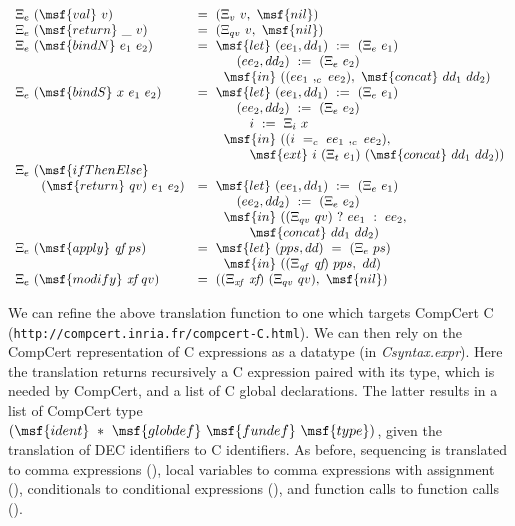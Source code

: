 \documentclass{article}
\begin{document}
\begin{gather}
\begin{array}{lll}  
\Xi_e \ (\msf{val} \ v) & = \ (\Xi_v \ v, \ \msf{nil}) \\
%
\Xi_e \ (\msf{return} \ \_ \ v) & = \ (\Xi_{qv} \ v, \ \msf{nil}) \\
%
\Xi_e \ (\msf{bindN} \ e_1 \ e_2) & = \ \msf{let} \ (ee_1, dd_1) \ :=
\ (\Xi_e \ e_1) \\ & \qquad \quad (ee_2, dd_2) \ := \ (\Xi_e \ e_2) \\
& \qquad \msf{in} \
((ee_1 \ ,_c \ ee_2), \ \msf{concat} \ dd_1 \ dd_2) \\
%
\Xi_e \ (\msf{bindS} \ x \ e_1 \ e_2) & = \ \msf{let} \ (ee_1, dd_1)
\ := \ (\Xi_e \ e_1) \\ & \qquad \quad (ee_2, dd_2) \ := \ (\Xi_e
\ e_2) \\ & \qquad \qquad i \ := \ \Xi_i \ x \\ & \qquad
\msf{in} \ ((i \ =_c \ ee_1 \ ,_c \ ee_2), \\ & \qquad \qquad \msf{ext}
\ i \ (\Xi_t \ e_1) \ (\msf{concat} \ dd_1 \ dd_2)) \\
%
\Xi_e \ (\msf{ifThenElse} \\ \qquad (\msf{return} \ qv) \ e_1 \ e_2) &
= \ \msf{let} \ (ee_1, dd_1) \ := \ (\Xi_e \ e_1) \\ & \qquad \quad
(ee_2, dd_2) \ := \ (\Xi_e \ e_2) \\ & \qquad \msf{in} \ ((\Xi_{qv}
\ qv) \ ? \ ee_1 \ : \ ee_2, \\ & \qquad \qquad \msf{concat} \ dd_1
\ dd_2) \\
%
\Xi_e \ (\msf{apply} \ \mbox{\it qf} \ ps) & = \ \msf{let} \ (pps, dd)
\ = \ (\Xi_e \ ps) \\ & \qquad \msf{in} \ ((\Xi_{\it{qf}} \ \mbox{\it
  qf}) \ pps, \ dd) \\
%
\Xi_e \ (\msf{modify} \ \mbox{\it xf} \ qv) & = \ ((\Xi_{\it{xf}}
\ \mbox{\it xf}) \ (\Xi_{qv} \ qv), \ \msf{nil})
\end{array}
\end{gather}



We can refine the above translation function to one which targets
CompCert C (\texttt{http://compcert.inria.fr/compcert-C.html}). We can
then rely on the CompCert representation of C expressions as a
datatype (in \emph{Csyntax.expr}). Here the translation returns
recursively a C expression paired with its type, which is needed by
CompCert, and a list of C global declarations. The latter results in a
list of CompCert type $(\msf{ident} \ * \ \msf{globdef} \ \msf{fundef}
\ \msf{type})$, given the translation of DEC identifiers to C
identifiers. As before, sequencing is translated to comma expressions
(\msf{Ecomma}), local variables to comma expressions with assignment
(\msf{Eassign}), conditionals to conditional expressions
(), and function calls to function calls
().
\end{document}
